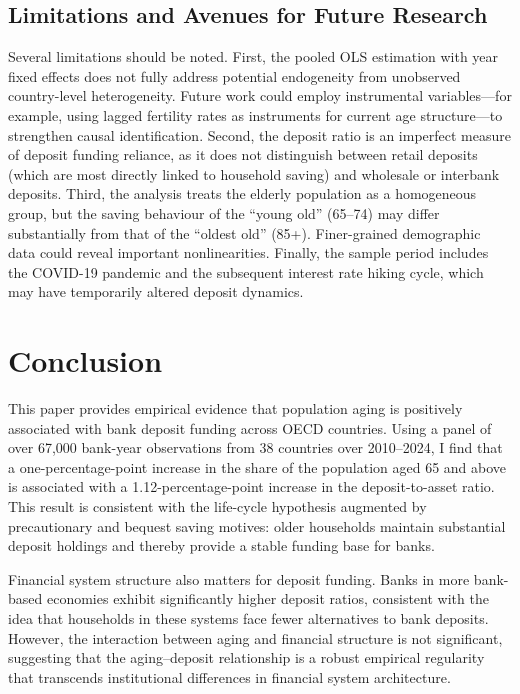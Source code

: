 \documentclass[12pt,a4paper]{article}
\begin{document}
\subsection{Limitations and Avenues for Future Research}

Several limitations should be noted. First, the pooled OLS estimation with year fixed effects does not fully address potential endogeneity from unobserved country-level heterogeneity. Future work could employ instrumental variables---for example, using lagged fertility rates as instruments for current age structure---to strengthen causal identification. Second, the deposit ratio is an imperfect measure of deposit funding reliance, as it does not distinguish between retail deposits (which are most directly linked to household saving) and wholesale or interbank deposits. Third, the analysis treats the elderly population as a homogeneous group, but the saving behaviour of the ``young old'' (65--74) may differ substantially from that of the ``oldest old'' (85+). Finer-grained demographic data could reveal important nonlinearities. Finally, the sample period includes the COVID-19 pandemic and the subsequent interest rate hiking cycle, which may have temporarily altered deposit dynamics.


\section{Conclusion}
\label{sec:conclusion}

This paper provides empirical evidence that population aging is positively associated with bank deposit funding across OECD countries. Using a panel of over 67,000 bank-year observations from 38 countries over 2010--2024, I find that a one-percentage-point increase in the share of the population aged 65 and above is associated with a 1.12-percentage-point increase in the deposit-to-asset ratio. This result is consistent with the life-cycle hypothesis augmented by precautionary and bequest saving motives: older households maintain substantial deposit holdings and thereby provide a stable funding base for banks.

Financial system structure also matters for deposit funding. Banks in more bank-based economies exhibit significantly higher deposit ratios, consistent with the idea that households in these systems face fewer alternatives to bank deposits. However, the interaction between aging and financial structure is not significant, suggesting that the aging--deposit relationship is a robust empirical regularity that transcends institutional differences in financial system architecture.
\end{document}
